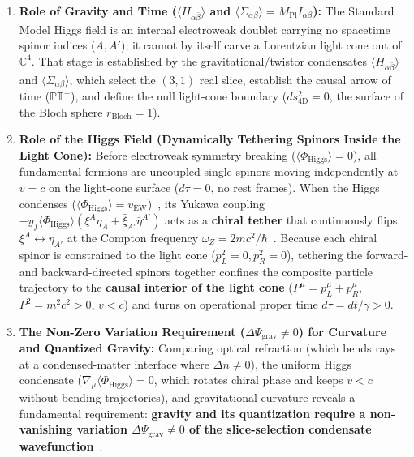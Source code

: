 \documentclass[11pt,a4paper]{article}
\begin{document}
\begin{enumerate}
    \item \textbf{Role of Gravity and Time ($\langle H_{\alpha\bar{\beta}} \rangle$ and $\langle \Sigma_{\alpha\beta} \rangle = M_{\text{Pl}} I_{\alpha\beta}$):}
    The Standard Model Higgs field is an internal electroweak doublet carrying no spacetime spinor indices ($A, A'$); it cannot by itself carve a Lorentzian light cone out of $\mathbb{C}^4$. That stage is established by the gravitational/twistor condensates $\langle H_{\alpha\bar{\beta}} \rangle$ and $\langle \Sigma_{\alpha\beta} \rangle$, which select the $(3,1)$ real slice, establish the causal arrow of time ($\mathbb{PT}^+$), and define the null light-cone boundary ($ds_{4\text{D}}^2 = 0$, the surface of the Bloch sphere $r_{\text{Bloch}} = 1$).
    \item \textbf{Role of the Higgs Field (Dynamically Tethering Spinors Inside the Light Cone):}
    Before electroweak symmetry breaking ($\langle \Phi_{\text{Higgs}} \rangle = 0$), all fundamental fermions are uncoupled single spinors moving independently at $v = c$ on the light-cone surface ($d\tau = 0$, no rest frames). When the Higgs condenses ($\langle \Phi_{\text{Higgs}} \rangle = v_{\text{EW}}$)~\cite{Higgs1964}, its Yukawa coupling $-y_f \langle\Phi_{\text{Higgs}}\rangle (\xi^A \eta_A + \bar{\xi}_{A'}\bar{\eta}^{A'})$ acts as a \textbf{chiral tether} that continuously flips $\xi^A \leftrightarrow \eta_{A'}$ at the Compton frequency $\omega_Z = 2mc^2/\hbar$~\cite{PenroseRoad2004}. Because each chiral spinor is constrained to the light cone ($p_L^2 = 0, p_R^2 = 0$), tethering the forward- and backward-directed spinors together confines the composite particle trajectory to the \textbf{causal interior of the light cone} ($P^\mu = p_L^\mu + p_R^\mu$, $P^2 = m^2c^2 > 0$, $v < c$) and turns on operational proper time $d\tau = dt/\gamma > 0$.
    \item \textbf{The Non-Zero Variation Requirement ($\Delta \Psi_{\text{grav}} \neq 0$) for Curvature and Quantized Gravity:}
    Comparing optical refraction (which bends rays at a condensed-matter interface where $\Delta n \neq 0$), the uniform Higgs condensate ($\nabla_\mu \langle\Phi_{\text{Higgs}}\rangle = 0$, which rotates chiral phase and keeps $v < c$ without bending trajectories), and gravitational curvature reveals a fundamental requirement: \textbf{gravity and its quantization require a non-vanishing variation $\Delta \Psi_{\text{grav}} \neq 0$ of the slice-selection condensate wavefunction}~\cite{Wesson1999,Newman1976}:
    \begin{equation}

\end{equation}
\end{enumerate}
\end{document}
